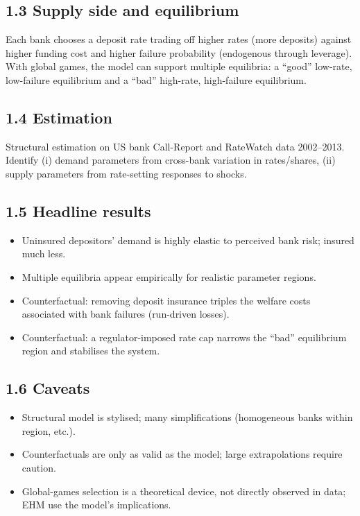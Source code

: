 \documentclass[11pt]{article}
\begin{document}
\subsection*{1.3 Supply side and equilibrium}
Each bank chooses a deposit rate trading off higher rates (more deposits) against higher funding cost and higher failure probability (endogenous through leverage). With global games, the model can support multiple equilibria: a ``good'' low-rate, low-failure equilibrium and a ``bad'' high-rate, high-failure equilibrium.

\subsection*{1.4 Estimation}
Structural estimation on US bank Call-Report and RateWatch data 2002--2013. Identify (i) demand parameters from cross-bank variation in rates/shares, (ii) supply parameters from rate-setting responses to shocks.

\subsection*{1.5 Headline results}
\begin{itemize}
\item Uninsured depositors' demand is highly elastic to perceived bank risk; insured much less.
\item Multiple equilibria appear empirically for realistic parameter regions.
\item Counterfactual: removing deposit insurance triples the welfare costs associated with bank failures (run-driven losses).
\item Counterfactual: a regulator-imposed rate cap narrows the ``bad'' equilibrium region and stabilises the system.
\end{itemize}

\subsection*{1.6 Caveats}
\begin{alertbox}
\begin{itemize}
\item Structural model is stylised; many simplifications (homogeneous banks within region, etc.).
\item Counterfactuals are only as valid as the model; large extrapolations require caution.
\item Global-games selection is a theoretical device, not directly observed in data; EHM use the model's implications.
\end{itemize}
\end{alertbox}
\end{document}
